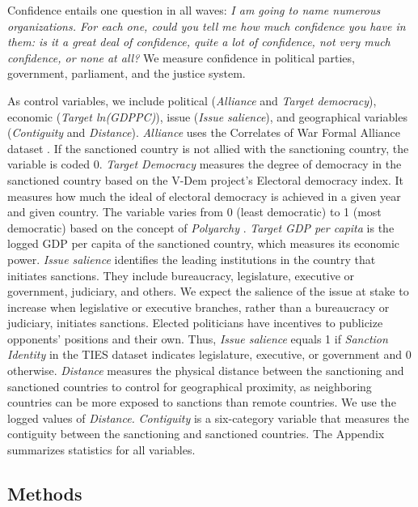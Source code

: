 \documentclass[12pt,]{article}
\begin{document}
Confidence entails one question in all waves: \emph{I am going to name
numerous organizations. For each one, could you tell me how much
confidence you have in them: is it a great deal of confidence, quite a
lot of confidence, not very much confidence, or none at all?} We measure
confidence in political parties, government, parliament, and the justice
system.

As control variables, we include political (\emph{Alliance} and
\emph{Target democracy}), economic (\emph{Target ln(GDPPC)}), issue
(\emph{Issue salience}), and geographical variables (\emph{Contiguity}
and \emph{Distance}). \emph{Alliance} uses the Correlates of War Formal
Alliance dataset \citep{gibler2009a}. If the sanctioned country is not
allied with the sanctioning country, the variable is coded 0.
\emph{Target Democracy} measures the degree of democracy in the
sanctioned country based on the V-Dem project's Electoral democracy
index. It measures how much the ideal of electoral democracy is achieved
in a given year and given country. The variable varies from 0 (least
democratic) to 1 (most democratic) based on the concept of
\emph{Polyarchy} \citep{coppedge2020a}. \emph{Target GDP per capita} is
the logged GDP per capita of the sanctioned country, which measures its
economic power. \emph{Issue salience} identifies the leading
institutions in the country that initiates sanctions. They include
bureaucracy, legislature, executive or government, judiciary, and
others. We expect the salience of the issue at stake to increase when
legislative or executive branches, rather than a bureaucracy or
judiciary, initiates sanctions. Elected politicians have incentives to
publicize opponents' positions and their own. Thus, \emph{Issue
salience} equals 1 if \emph{Sanction Identity} in the TIES dataset
indicates legislature, executive, or government and 0 otherwise.
\emph{Distance} measures the physical distance between the sanctioning
and sanctioned countries to control for geographical proximity, as
neighboring countries can be more exposed to sanctions than remote
countries. We use the logged values of \emph{Distance.}
\emph{Contiguity} is a six-category variable that measures the
contiguity between the sanctioning and sanctioned countries. The
Appendix summarizes statistics for all variables.

\hypertarget{methods}{%
\subsection{Methods}\label{methods}}
\end{document}

